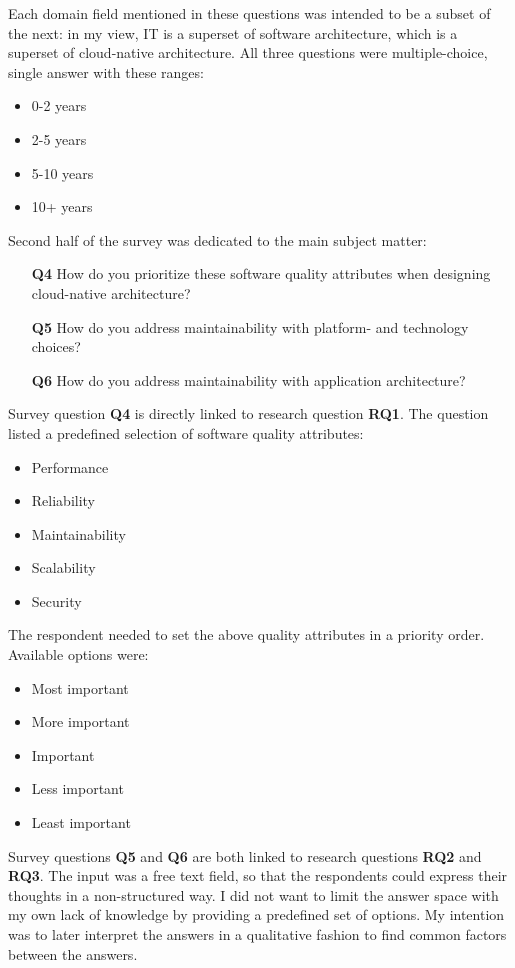 \documentclass[utf8,english]{gradu3}
\begin{document}
Each domain field mentioned in these questions was intended to be a subset of
the next: in my view, IT is a superset of software architecture, which is a
superset of cloud-native architecture.  All three questions were
multiple-choice, single answer with these ranges:
\begin{itemize}
  \item 0-2 years
  \item 2-5 years
  \item 5-10 years
  \item 10+ years
\end{itemize}

Second half of the survey was dedicated to the main subject matter:
\begin{enumerate}
  \item [\textbf{Q4}] How do you prioritize these software quality attributes
        when designing cloud-native architecture?
  \item [\textbf{Q5}] How do you address maintainability with platform- and
        technology choices?
  \item [\textbf{Q6}] How do you address maintainability with application
        architecture?
\end{enumerate}

Survey question \textbf{Q4} is directly linked to research question
\textbf{RQ1}.  The question listed a predefined selection of software quality
attributes:
\begin{itemize}
  \item Performance
  \item Reliability
  \item Maintainability
  \item Scalability
  \item Security
\end{itemize}

The respondent needed to set the above quality attributes in a priority order.
Available options were:
\begin{itemize}
  \item Most important
  \item More important
  \item Important
  \item Less important
  \item Least important
\end{itemize}

Survey questions \textbf{Q5} and \textbf{Q6} are both linked to research
questions \textbf{RQ2} and \textbf{RQ3}.  The input was a free text field, so
that the respondents could express their thoughts in a non-structured way.  I
did not want to limit the answer space with my own lack of knowledge by
providing a predefined set of options.  My intention was to later interpret the
answers in a qualitative fashion to find common factors between the answers.
\end{document}
